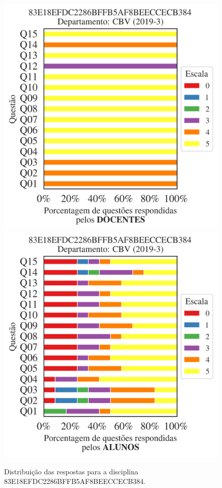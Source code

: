 \documentclass[a4paper,10pt]{article}
\begin{document}
\begin{figure}[h]
\centering
\includegraphics[width=0.485\linewidth]{analise_disciplina_departamento_CBV_83E18EFDC2286BFFB5AF8BEECCECB384_docentes.png}
\includegraphics[width=0.485\linewidth]{analise_disciplina_departamento_CBV_83E18EFDC2286BFFB5AF8BEECCECB384_alunos.png}
\caption{\label{fig:analise_geral_departamento}                Distribuição das respostas para a disciplina 83E18EFDC2286BFFB5AF8BEECCECB384. }
\end{figure}
\end{document}

